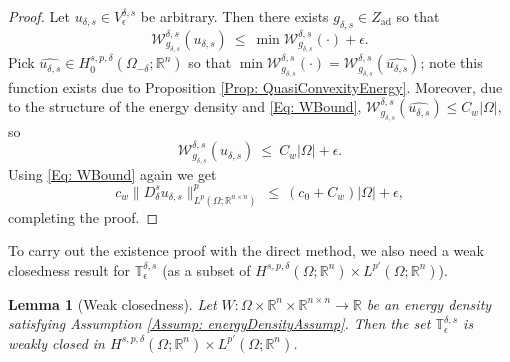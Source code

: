 \documentclass[11pt, reqno]{amsart}   	%
\theoremstyle{plain}
\numberwithin{equation}{section}
\newtheorem{lemma}[thm]{Lemma}
\def\de{\delta}
\def\ep{\epsilon}
\def\Om{\Omega}
\def\R{\mathbb{R}}
\begin{document}
    \begin{proof}
    Let $u_{\de, s} \in V^{\de, s}_{\ep}$ be arbitrary. Then there exists $g_{\de, s} \in Z_{\text{ad}}$ so that
    \begin{equation}\label{Eq: UNLAdmisQuasiEq1}
        \mathcal{W}^{\de, s}_{g_{\de, s}}(u_{\de, s})  \ \leq \ \min \mathcal{W}^{\de, s}_{g_{\de, s}}(\cdot) + \ep.
    \end{equation}
    Pick $\widehat{u_{\de, s}} \in H^{s, p, \de}_0(\Om_{-\de}; \R^n)$ so that $\min \mathcal{W}^{\de, s}_{g_{\de, s}}(\cdot) = \mathcal{W}^{\de, s}_{g_{\de, s}}(\widehat{u_{\de, s}})$; note this function exists due to Proposition \ref{Prop: QuasiConvexityEnergy}. Moreover, due to the structure of the energy density and \eqref{Eq: WBound}, $\mathcal{W}^{\de, s}_{g_{\de, s}}(\widehat{u_{\de, s}}) \leq C_w|\Om|$, so 
    \begin{equation}\label{Eq: UNLAdmisQuasiEq2}
         \mathcal{W}^{\de, s}_{g_{\de, s}}(u_{\de, s})  \ \leq \ C_w|\Om| + \ep.
    \end{equation}
    Using \eqref{Eq: WBound} again we get
    \begin{equation}\label{Eq: UNLAdmisQuasiEq3}
        c_w\|D^s_{\de}u_{\de, s}\|^p_{L^p(\Om; \R^{n \times n})} \ \leq \ (c_0 + C_w)|\Om| + \ep,
    \end{equation}
    completing the proof.
    \end{proof}

    To carry out the existence proof with the direct method, we also need a weak closedness result for $\mathbb{T}^{\de, s}_{\ep}$ (as a subset of $H^{s, p, \de}(\Om; \R^n) \times L^{p'}(\Om; \R^n)$). 

 \begin{lemma}[Weak closedness]\label{Lem: NLClosureOfMinimizationQuasi}
         Let $W: \Om \times \R^n \times \R^{n \times n} \rightarrow \R$ be an energy density satisfying Assumption \eqref{Assump: energyDensityAssump}. Then the set $\mathbb{T}^{\de, s}_{\ep}$ is weakly closed in $H^{s, p, \de}(\Om; \R^n) \times L^{p'}(\Om; \R^n)$.
    \end{lemma}
\end{document}
